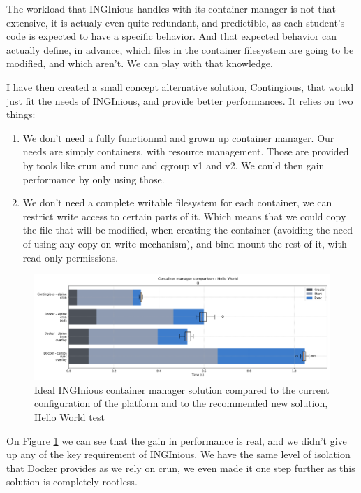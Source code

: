 The workload that INGInious handles with its container manager is not that extensive, it is actualy even quite redundant, and predictible, as each student's code is expected to have a specific behavior.  And that expected behavior can actually define, in advance, which files in the container filesystem are going to be modified, and which aren't.  We can play with that knowledge.

I have then created a small concept alternative solution, Contingious, that would just fit the needs of INGInious, and provide better performances.  It relies on two things:
\begin{enumerate}
  \item We don't need a fully functionnal and grown up container manager. Our needs are simply containers, with resource management.  Those are provided by tools like crun and runc and cgroup v1 and v2.  We could then gain performance by only using those.
  \item We don't need a complete writable filesystem for each container, we can restrict write access to certain parts of it.  Which means that we could copy the file that will be modified, when creating the container (avoiding the need of using any copy-on-write mechanism), and bind-mount the rest of it, with read-only permissions.
\end{enumerate}

\begin{figure}[h!]
  \begin{center}
    \includegraphics[width=\linewidth]{images/question-2-hello-world.png}
    \caption{Ideal INGInious container manager solution compared to the current configuration of the platform and to the recommended new solution, Hello World test}
    \label{fig:q2:hello-world}
  \end{center}
\end{figure}

On Figure \ref{fig:q2:hello-world} we can see that the gain in performance is real, and we didn't give up any of the key requirement of INGInious.  We have the same level of isolation that Docker provides as we rely on crun, we even made it one step further as this solution is completely rootless.

